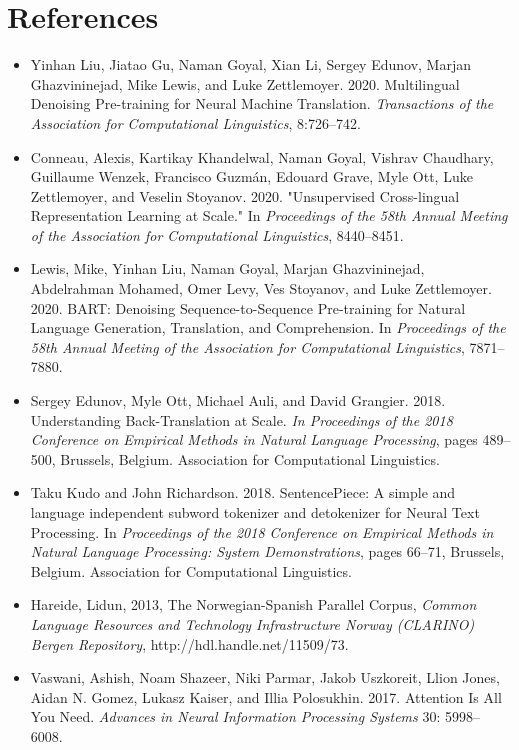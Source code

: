 \documentclass[11pt]{article}
\begin{document}
\section*{References} 
\begin{itemize}
    \item Yinhan Liu, Jiatao Gu, Naman Goyal, Xian Li, Sergey Edunov, Marjan Ghazvininejad, Mike Lewis, and Luke Zettlemoyer. 2020. Multilingual Denoising Pre-training for Neural Machine Translation. \textit{Transactions of the Association for Computational Linguistics}, 8:726–742.
    \item Conneau, Alexis, Kartikay Khandelwal, Naman Goyal, Vishrav Chaudhary, Guillaume Wenzek, Francisco Guzmán, Edouard Grave, Myle Ott, Luke Zettlemoyer, and Veselin Stoyanov. 2020. "Unsupervised Cross-lingual Representation Learning at Scale." In \textit{Proceedings of the 58th Annual Meeting of the Association for Computational Linguistics}, 8440--8451.
    \item Lewis, Mike, Yinhan Liu, Naman Goyal, Marjan Ghazvininejad, Abdelrahman Mohamed, Omer Levy, Ves Stoyanov, and Luke Zettlemoyer. 2020. BART: Denoising Sequence-to-Sequence Pre-training for Natural Language Generation, Translation, and Comprehension. In \textit{Proceedings of the 58th Annual Meeting of the Association for Computational Linguistics}, 7871–7880.
    \item Sergey Edunov, Myle Ott, Michael Auli, and David Grangier. 2018. Understanding Back-Translation at Scale. \textit{In Proceedings of the 2018 Conference on Empirical Methods in Natural Language Processing}, pages 489–500, Brussels, Belgium. Association for Computational Linguistics.
    \item Taku Kudo and John Richardson. 2018. SentencePiece: A simple and language independent subword tokenizer and detokenizer for Neural Text Processing. In \textit{Proceedings of the 2018 Conference on Empirical Methods in Natural Language Processing: System Demonstrations}, pages 66–71, Brussels, Belgium. Association for Computational Linguistics.
    \item Hareide, Lidun, 2013, The Norwegian-Spanish Parallel Corpus, \textit{Common Language Resources and Technology Infrastructure Norway (CLARINO) Bergen Repository}, http://hdl.handle.net/11509/73.
    \item Vaswani, Ashish, Noam Shazeer, Niki Parmar, Jakob Uszkoreit, Llion Jones, Aidan N. Gomez, Lukasz Kaiser, and Illia Polosukhin. 2017. Attention Is All You Need. \textit{Advances in Neural Information Processing Systems} 30: 5998–6008.
  
  
\end{itemize}
\end{document}
